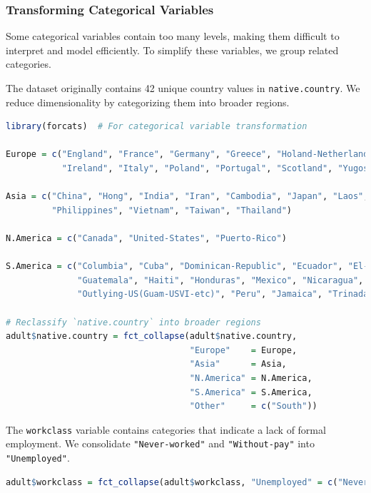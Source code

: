 \documentclass[
  11pt,
]{book}
\newcommand{\passthrough}[1]{#1}
\theoremstyle{definition}
\theoremstyle{definition}
\theoremstyle{definition}
\theoremstyle{definition}
\theoremstyle{remark}
\begin{document}
\subsubsection*{Transforming Categorical Variables}\label{transforming-categorical-variables}


Some categorical variables contain too many levels, making them difficult to interpret and model efficiently. To simplify these variables, we group related categories.

The dataset originally contains 42 unique country values in \passthrough{\lstinline!native.country!}. We reduce dimensionality by categorizing them into broader regions.

\begin{lstlisting}[language=R]
library(forcats)  # For categorical variable transformation

Europe = c("England", "France", "Germany", "Greece", "Holand-Netherlands", "Hungary", 
           "Ireland", "Italy", "Poland", "Portugal", "Scotland", "Yugoslavia")

Asia = c("China", "Hong", "India", "Iran", "Cambodia", "Japan", "Laos", 
         "Philippines", "Vietnam", "Taiwan", "Thailand")

N.America = c("Canada", "United-States", "Puerto-Rico")

S.America = c("Columbia", "Cuba", "Dominican-Republic", "Ecuador", "El-Salvador", 
              "Guatemala", "Haiti", "Honduras", "Mexico", "Nicaragua", 
              "Outlying-US(Guam-USVI-etc)", "Peru", "Jamaica", "Trinadad&Tobago")

# Reclassify `native.country` into broader regions
adult$native.country = fct_collapse(adult$native.country, 
                                    "Europe"    = Europe,
                                    "Asia"      = Asia,
                                    "N.America" = N.America,
                                    "S.America" = S.America,
                                    "Other"     = c("South"))
\end{lstlisting}

The \passthrough{\lstinline!workclass!} variable contains categories that indicate a lack of formal employment. We consolidate \passthrough{\lstinline!"Never-worked"!} and \passthrough{\lstinline!"Without-pay"!} into \passthrough{\lstinline!"Unemployed"!}.

\begin{lstlisting}[language=R]
adult$workclass = fct_collapse(adult$workclass, "Unemployed" = c("Never-worked", "Without-pay"))
\end{lstlisting}
\end{document}
